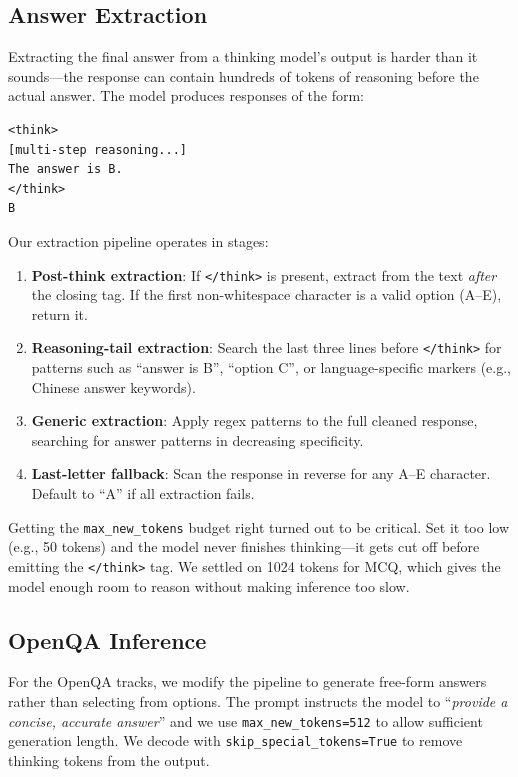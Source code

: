 \documentclass[]{ceurart}
\begin{document}
\subsection{Answer Extraction}
\label{sec:extraction}

Extracting the final answer from a thinking model's output is harder than it sounds---the response can contain hundreds of tokens of reasoning before the actual answer.
The model produces responses of the form:

\begin{lstlisting}
<think>
[multi-step reasoning...]
The answer is B.
</think>
B
\end{lstlisting}

Our extraction pipeline operates in stages:

\begin{enumerate}
    \item \textbf{Post-think extraction}: If \texttt{</think>} is present, extract from the text \textit{after} the closing tag. If the first non-whitespace character is a valid option (A--E), return it.
    \item \textbf{Reasoning-tail extraction}: Search the last three lines before \texttt{</think>} for patterns such as ``answer is B'', ``option C'', or language-specific markers (e.g., Chinese answer keywords).
    \item \textbf{Generic extraction}: Apply regex patterns to the full cleaned response, searching for answer patterns in decreasing specificity.
    \item \textbf{Last-letter fallback}: Scan the response in reverse for any A--E character. Default to ``A'' if all extraction fails.
\end{enumerate}

Getting the \texttt{max\_new\_tokens} budget right turned out to be critical.
Set it too low (e.g., 50 tokens) and the model never finishes thinking---it gets cut off before emitting the \texttt{</think>} tag.
We settled on 1024 tokens for MCQ, which gives the model enough room to reason without making inference too slow.

\subsection{OpenQA Inference}
\label{sec:openqa}

For the OpenQA tracks, we modify the pipeline to generate free-form answers rather than selecting from options.
The prompt instructs the model to ``\textit{provide a concise, accurate answer}'' and we use \texttt{max\_new\_tokens=512} to allow sufficient generation length.
We decode with \texttt{skip\_special\_tokens=True} to remove thinking tokens from the output.
\end{document}
